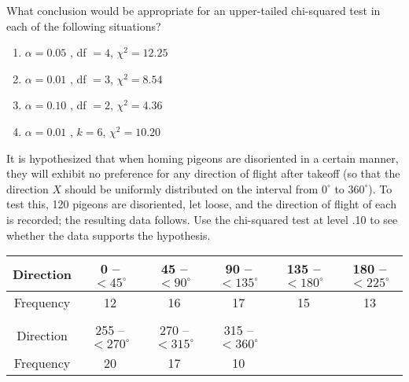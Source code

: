 \documentclass[11pt,letterpaper,boxed]{hmcpset}
\begin{document}


    \begin{problem}[14.1.1]
    	What conclusion would be appropriate for an upper-tailed chi-squared test in each of the following situations?

        \begin{enumerate}
            \item $\alpha = 0.05$ , df $= 4$, $\chi^2 = 12.25$

            \item $\alpha = 0.01$ , df $= 3$, $\chi^2 = 8.54$

            \item $\alpha = 0.10$ , df $= 2$, $\chi^2 = 4.36$

            \item $\alpha = 0.01$ , $k = 6$, $\chi^2 = 10.20$
        \end{enumerate}
    \end{problem}

    \begin{solution}
        \vfill
    \end{solution}
    \newpage


    \begin{problem}[14.1.3]
        It is hypothesized that when homing pigeons are disoriented in a certain manner, they will exhibit no preference for any direction of flight after takeoff (so that the direction $X$ should be uniformly distributed on the interval from $0^\circ$ to $360^\circ$). To test this, 120 pigeons are disoriented, let loose, and the direction of flight of each is recorded; the resulting data follows. Use the chi-squared test at level .10 to see whether the data supports the hypothesis.

        \begin{tabular}{c|c c c c c}
        Direction & 0 -- $< 45^\circ$   & 45 -- $< 90^\circ$    & 90 -- $< 135^\circ$   & 135 -- $< 180^\circ$  & 180 -- $< 225^\circ$  \\
        \hline
        Frequency & 12                  & 16                    & 17                    & 15                    & 13                    \\
        \\
        Direction & 255 -- $< 270^\circ$& 270 -- $< 315^\circ$  & 315 -- $< 360^\circ$  \\
        \hline
        Frequency & 20                  & 17                    & 10                    \\
        \end{tabular}
    \end{problem}
\end{document}
